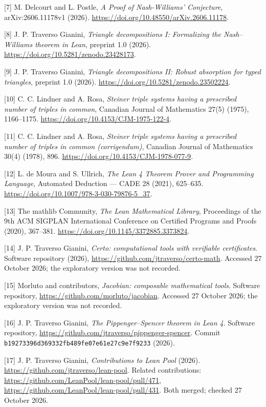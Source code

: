 \documentclass[english,11pt,a4paper]{article}
\begin{document}
{[}7{]} M. Delcourt and L. Postle, \emph{A Proof of Nash-Williams' Conjecture}, arXiv:2606.11178v1 (2026). \url{https://doi.org/10.48550/arXiv.2606.11178}.

{[}8{]} J. P. Traverso Gianini, \emph{Triangle decompositions I: Formalizing the Nash--Williams theorem in Lean}, preprint 1.0 (2026). \url{https://doi.org/10.5281/zenodo.23428173}.

{[}9{]} J. P. Traverso Gianini, \emph{Triangle decompositions II: Robust absorption for typed triangles}, preprint 1.0 (2026). \url{https://doi.org/10.5281/zenodo.23502224}.

{[}10{]} C. C. Lindner and A. Rosa, \emph{Steiner triple systems having a prescribed number of triples in common}, Canadian Journal of Mathematics 27(5) (1975), 1166--1175. \url{https://doi.org/10.4153/CJM-1975-122-4}.

{[}11{]} C. C. Lindner and A. Rosa, \emph{Steiner triple systems having a prescribed number of triples in common (corrigendum)}, Canadian Journal of Mathematics 30(4) (1978), 896. \url{https://doi.org/10.4153/CJM-1978-077-9}.

{[}12{]} L. de Moura and S. Ullrich, \emph{The Lean 4 Theorem Prover and Programming Language}, Automated Deduction --- CADE 28 (2021), 625--635. \url{https://doi.org/10.1007/978-3-030-79876-5_37}.

{[}13{]} The mathlib Community, \emph{The Lean Mathematical Library}, Proceedings of the 9th ACM SIGPLAN International Conference on Certified Programs and Proofs (2020), 367--381. \url{https://doi.org/10.1145/3372885.3373824}.

{[}14{]} J. P. Traverso Gianini, \emph{Certo: computational tools with verifiable certificates}. Software repository (2026), \url{https://github.com/jtraverso/certo-math}. Accessed 27 October 2026; the exploratory version was not recorded.

{[}15{]} Morluto and contributors, \emph{Jacobian: composable mathematical tools}. Software repository, \url{https://github.com/morluto/jacobian}. Accessed 27 October 2026; the exploratory version was not recorded.

{[}16{]} J. P. Traverso Gianini, \emph{The Pippenger--Spencer theorem in Lean 4}. Software repository, \url{https://github.com/jtraverso/pippenger-spencer}. Commit \texttt{b1927339\allowbreak{}6d369332\allowbreak{}fb489fe0\allowbreak{}7e61e27c\allowbreak{}9e7f9233} (2026).

{[}17{]} J. P. Traverso Gianini, \emph{Contributions to Lean Pool} (2026). \url{https://github.com/jtraverso/lean-pool}. Related contributions: \url{https://github.com/LeanPool/lean-pool/pull/471}, \url{https://github.com/LeanPool/lean-pool/pull/431}. Both merged; checked 27 October 2026.
\end{document}
